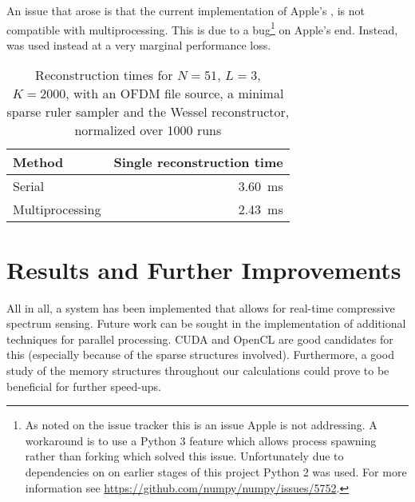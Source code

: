 \documentclass[a4paper, openany, oneside]{memoir}
\begin{document}
An issue that arose is that the current implementation of Apple's , is not compatible with multiprocessing. This is due to a bug\footnote{As noted on the  issue tracker this is an issue Apple is not addressing. A workaround is to use a Python 3 feature which allows process spawning rather than forking which solved this issue. Unfortunately due to dependencies on  on earlier stages of this project Python 2 was used. For more information see \url{https://github.com/numpy/numpy/issues/5752}.} on Apple's end. Instead,  was used instead at a very marginal performance loss.

\begin{table}
    \centering
    \caption{Reconstruction times for $N = 51$, $L=3$, $K=2000$, with an OFDM file source, a minimal sparse ruler sampler and the Wessel reconstructor, normalized over 1000 runs}
    \label{tab:mp}
    \begin{tabular}{lr}
        \toprule
        Method          & Single reconstruction time\\
        \midrule
        Serial          & \SI{3.60}{\milli\second}\\
        Multiprocessing & \SI{2.43}{\milli\second}\\
        \bottomrule
    \end{tabular}
\end{table}

\section{Results and Further Improvements}
\label{sec:results}
All in all, a system has been implemented that allows for real-time compressive spectrum sensing. Future work can be sought in the implementation of additional techniques for parallel processing. CUDA and OpenCL are good candidates for this (especially because of the sparse structures involved). Furthermore, a good study of the memory structures throughout our calculations could prove to be beneficial for further speed-ups.
\end{document}
